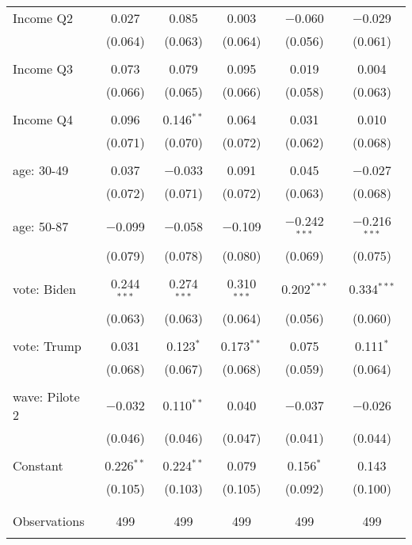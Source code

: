 \begin{tabular}{@{\extracolsep{5pt}}lccccc}
 Income Q2 & 0.027 & 0.085 & 0.003 & $-$0.060 & $-$0.029 \\ 
  & (0.064) & (0.063) & (0.064) & (0.056) & (0.061) \\ 
  & & & & & \\ 
 Income Q3 & 0.073 & 0.079 & 0.095 & 0.019 & 0.004 \\ 
  & (0.066) & (0.065) & (0.066) & (0.058) & (0.063) \\ 
  & & & & & \\ 
 Income Q4 & 0.096 & 0.146$^{**}$ & 0.064 & 0.031 & 0.010 \\ 
  & (0.071) & (0.070) & (0.072) & (0.062) & (0.068) \\ 
  & & & & & \\ 
 age: 30-49 & 0.037 & $-$0.033 & 0.091 & 0.045 & $-$0.027 \\ 
  & (0.072) & (0.071) & (0.072) & (0.063) & (0.068) \\ 
  & & & & & \\ 
 age: 50-87 & $-$0.099 & $-$0.058 & $-$0.109 & $-$0.242$^{***}$ & $-$0.216$^{***}$ \\ 
  & (0.079) & (0.078) & (0.080) & (0.069) & (0.075) \\ 
  & & & & & \\ 
 vote: Biden & 0.244$^{***}$ & 0.274$^{***}$ & 0.310$^{***}$ & 0.202$^{***}$ & 0.334$^{***}$ \\ 
  & (0.063) & (0.063) & (0.064) & (0.056) & (0.060) \\ 
  & & & & & \\ 
 vote: Trump & 0.031 & 0.123$^{*}$ & 0.173$^{**}$ & 0.075 & 0.111$^{*}$ \\ 
  & (0.068) & (0.067) & (0.068) & (0.059) & (0.064) \\ 
  & & & & & \\ 
 wave: Pilote 2 & $-$0.032 & 0.110$^{**}$ & 0.040 & $-$0.037 & $-$0.026 \\ 
  & (0.046) & (0.046) & (0.047) & (0.041) & (0.044) \\ 
  & & & & & \\ 
 Constant & 0.226$^{**}$ & 0.224$^{**}$ & 0.079 & 0.156$^{*}$ & 0.143 \\ 
  & (0.105) & (0.103) & (0.105) & (0.092) & (0.100) \\ 
  & & & & & \\ 
\hline \\[-1.8ex] 

Observations & 499 & 499 & 499 & 499 & 499 \\ 
\hline 
\hline \\[-1.8ex] 
\end{tabular} 